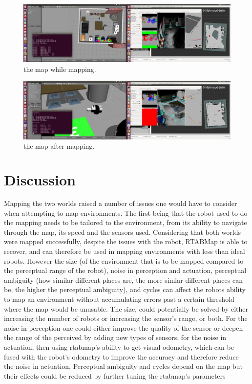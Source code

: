 \documentclass[10pt,journal,compsoc]{IEEEtran}
\begin{document}
\begin{figure}[thpb]
      \centering
      \includegraphics[width=\linewidth]{warehouse_world_2}
      \caption{the map while mapping.}
\end{figure}




\begin{figure}[thpb]
      \centering
      \includegraphics[width=\linewidth]{warehouse_world_full_map}
      \caption{the map after mapping.}
\end{figure}


\section{Discussion}
Mapping the two worlds raised a number of issues one
would have to consider when attempting to map environments. The first being that the robot used to do the
mapping needs to be tailored to the environment, from
its ability to navigate through the map, its speed and the
sensors used. Considering that both worlds were mapped
successfully, despite the issues with the robot, RTABMap
is able to recover, and can therefore be used in mapping
environments with less than ideal robots. However the
size (of the environment that is to be mapped compared
to the perceptual range of the robot), noise in perception and actuation, perceptual ambiguity (how similar different
places are, the more simlar different places can be, the higher
the perceptual ambiguity), and cycles can affect the robots
ability to map an environment without accumulating errors
past a certain threshold where the map would be unusable.
The size, could potentially be solved by either increasing
the number of robots or increasing the sensor’s range, or
both. For the noise in perception one could either improve the quality of the sensor or deepen the range of the
perceived by adding new types of sensors, for the noise
in actuation, then using rtabmap’s ability to get visual
odometry, which can be fused with the robot’s odometry
to improve the accuracy and therefore reduce the noise in
actuation. Perceptual ambiguity and cycles depend on the
map but their effects could be reduced by further tuning the
rtabmap’s parameters
\end{document}
